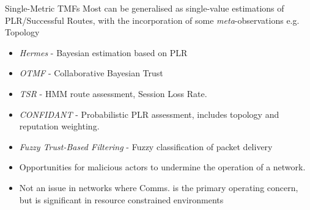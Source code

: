 \documentclass{beamer}
\begin{document}
\begin{frame}[allowframebreaks]{Single-Metric TMFs}
  Most can be generalised as single-value estimations of PLR/Successful Routes, with the incorporation of some \emph{meta}-observations e.g. Topology
  \begin{itemize}
    \item \emph{Hermes} \autocite{Zouridaki2005} - Bayesian estimation based on PLR
    \item \emph{OTMF} \autocite{Li2008} - Collaborative Bayesian Trust
    \item \emph{TSR} \autocite{Moe2008a} - HMM route assessment, Session Loss Rate.
    \item \emph{CONFIDANT} \autocite{Buchegger2002} - Probabilistic PLR assessment, includes topology and reputation weighting.
    \item \emph{Fuzzy Trust-Based Filtering} \autocite{Luo2008} - Fuzzy classification of packet delivery
  \end{itemize}
  \framebreak
  \begin{itemize}
  \item
    Opportunities for malicious actors to undermine the operation of a network. 
  \item 
    Not an issue in networks where Comms. is the primary operating concern, but is significant in resource constrained environments
  \end{itemize}

\end{frame}
\end{document}
